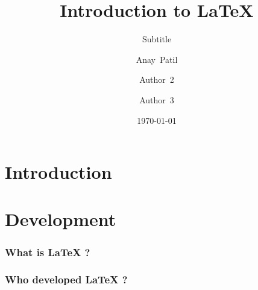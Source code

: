 \documentclass{beamer}
\begin{document}
    \begin{frame}
        \title{Introduction to \LaTeX{}}
        \author{Anay~Patil \and 
        Author~2 \and
        Author~3}
        \date{\today}
        \subtitle{Subtitle}
        \maketitle
    \end{frame}
    \section{Introduction}
    \section{Development}
    \begin{frame}
        \tableofcontents
    \end{frame}
    \begin{frame}
        \frametitle{What is LaTeX ?}
        \blindtext
    \end{frame}
    \begin{frame}
        \frametitle{Who developed LaTeX ?}
        \blindtext
    \end{frame}
\end{document}
